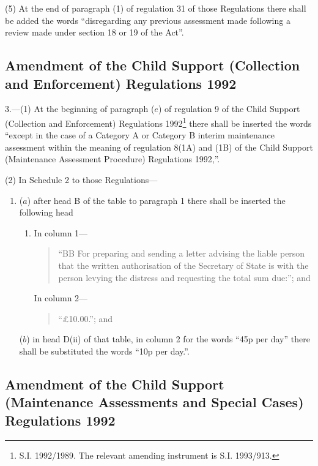 \documentclass[12pt,a4paper]{article}
\begin{document}
(5) At the end of paragraph (1) of regulation 31 of those Regulations there shall be added the words “disregarding any previous assessment made following a review made under section 18 or 19 of the Act”.

\subsection[3. Amendment of the Child Support (Collection and Enforcement) Regulations 1992]{Amendment of the Child Support (Collection and Enforcement) Regulations 1992}

3.—(1) At the beginning of paragraph ($e$) of regulation 9 of the Child Support (Collection and Enforcement) Regulations 1992\footnote{\frenchspacing S.I. 1992/1989. The relevant amending instrument is S.I. 1993/913.} there shall be inserted the words “except in the case of a Category A or Category B interim maintenance assessment within the meaning of regulation 8(1A) and (1B) of the Child Support (Maintenance Assessment Procedure) Regulations 1992,”.

(2) In Schedule 2 to those Regulations—
\begin{enumerate}\item[]
($a$) after head B of the table to paragraph 1 there shall be inserted the following head
\begin{enumerate}\item[]
In column 1—
\begin{quotation}
“BB For preparing and sending a letter advising the liable person that the written authorisation of the Secretary of State is with the person levying the distress and requesting the total sum due:”; and
\end{quotation}

In column 2—
\begin{quotation}
“£10.00.”; and
\end{quotation}
\end{enumerate}

($b$) in head D(ii) of that table, in column 2 for the words “45p per day” there shall be substituted the words “10p per day.”.
\end{enumerate}

\subsection[4. Amendment of the Child Support (Maintenance Assessments and Special Cases) Regulations 1992]{Amendment of the Child Support (Maintenance Assessments and Special Cases) Regulations 1992}
\end{document}
